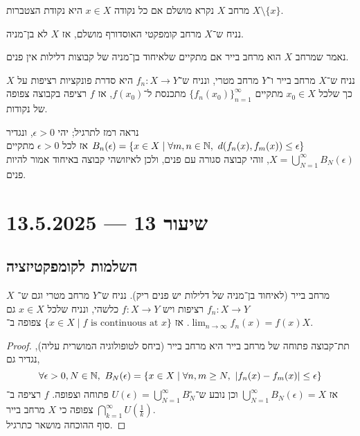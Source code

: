 \begin{definition}
	מרחב $X$ נקרא מושלם אם כל נקודה $x \in X$ היא נקודת הצטברות $X \setminus \{ x \}$.
\end{definition}
\begin{corollary}
	נניח ש־$X$ מרחב קומפקטי האוסדורף מושלם, אז $X$ לא בן־מניה.
\end{corollary}
\begin{definition}
	נאמר שמרחב $X$ הוא מרחב בייר אם מתקיים שלאיחוד בן־מניה של קבוצות דלילות אין פנים.
\end{definition}
\begin{exercise}
	נניח ש־$X$ מרחב בייר ו־$Y$ מרחב מטרי, ונניח ש־$f_n : X \to Y$ היא סדרת פונקציות רציפות על $X$ כך שלכל $x_0 \in X$ מתקיים ${\{ f_n(x_0) \}}_{n = 1}^\infty$ מתכנסת ל־$f(x_0)$,
	אז $f$ רציפה בקבוצה צפופה של נקודות.
\end{exercise}
נראה רמז לתרגיל;
יהי $\epsilon > 0$, ונגדיר $B_n(\epsilon) = \{ x \in X \mid \forall m, n \in \mathbb{N},\ d(f_n(x), f_m(x)) \le \epsilon \}$
אז לכל $\epsilon > 0$ מתקיים $X = \bigcup_{N = 1}^\infty B_N(\epsilon)$, זוהי קבוצה סגורה עם פנים, ולכן לאיזושהי קבוצה באיחוד אמור להיות פנים.

\section{שיעור 13 --- 13.5.2025}

\subsection{השלמות לקומפקטיזציה}
$X$ מרחב בייר (לאיחוד בן־מניה של דלילות יש פנים ריק).
נניח ש־$Y$ מרחב מטרי וגם ש־$f_n : X \to Y$ רציפות ויש $f : X \to Y$ כלשהי, ונניח שלכל $x \in X$ גם $\lim_{n \to \infty} f_n(x) = f(x)$.
אז $\{ x \in X \mid f \text{ is continuous at } x \}$ צפופה ב־$X$.
\begin{proof}
	תת־קבוצה פתוחה של מרחב בייר היא מרחב בייר (ביחס לטופולוגיה המושרית עליה),
	נגדיר גם,
	\[
		\forall \epsilon > 0, N \in \NN,\ 
		B_N(\epsilon) = \{ x \in X \mid \forall n, m \ge N,\ |f_n(x) - f_m(x)| \le \epsilon \}
	\]
	אז $\bigcup_{N = 1}^\infty B_N(\epsilon) = X$ וכן נובע ש־$U(\epsilon) = \bigcup_{N = 1}^\infty B_N^\circ$ פתוחה וצפופה.
	$f$ רציפה ב־$\bigcap_{k = 1}^\infty U(\frac{1}{k})$ צפופה כי $X$ מרחב בייר. \\
	סוף ההוכחה מושאר כתרגיל.
\end{proof}

